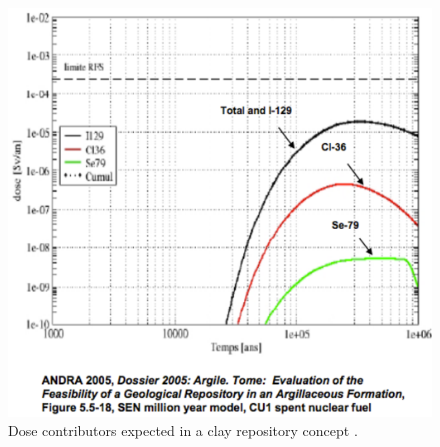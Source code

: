 \begin{figure}[htbp!]
  \begin{center}
    \includegraphics[width=0.7\textheight]{swift_clay_dose.eps}
  \end{center}
  \caption{Dose contributors expected in a clay repository concept 
    \cite{swift_applying_2010}.}
  \label{fig:swift_clay_dose}
\end{figure}

